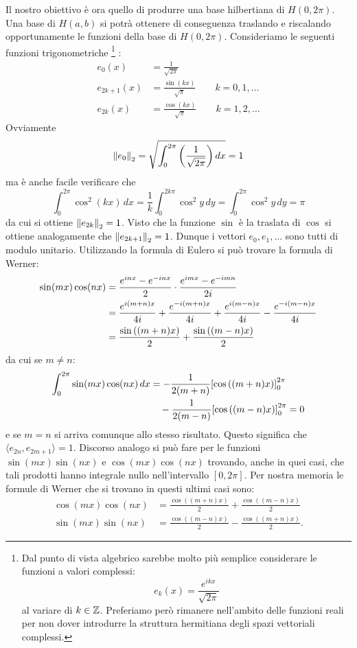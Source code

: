 Il nostro obiettivo è ora quello di produrre una base hilbertiana di $H(0,2\pi)$.
Una base di $H(a,b)$ si potrà ottenere di conseguenza traslando e riscalando opportunamente le funzioni della base di $H(0,2\pi)$.
Consideriamo le seguenti funzioni trigonometriche%
\footnote{
Dal punto di vista algebrico sarebbe molto più semplice considerare le
funzioni a valori complessi:
\[
  e_k(x) = \frac{e^{ikx}}{\sqrt{2\pi}}
\]
al variare di $k\in \mathbb Z$. Preferiamo però rimanere nell'ambito delle funzioni
reali per non dover introdurre la struttura hermitiana
degli spazi vettoriali complessi.}%
:
\begin{equation}\label{eq:54741346}
\begin{aligned}
  e_0 (x) &= \frac{1}{\sqrt{2\pi}} \\
  e_{2k+1}(x) &= \frac{\sin(kx)}{\sqrt{\pi}} \qquad k=0,1,\dots\\
  e_{2k}(x) &= \frac{\cos(kx)}{\sqrt{\pi}} \qquad k=1,2,\dots
\end{aligned}
\end{equation}
Ovviamente
\[
  {\left\Vert e_0\right\Vert}_2=\sqrt{\int_{0}^{2\pi} {\left( \frac{1}{\sqrt{2\pi}} \right)}\, dx} = 1
\]
ma è anche facile verificare che
\[
  \int_{0}^{2\pi} \cos^2 (kx)\, dx
  = \frac{1}{k}\int_{0}^{2k\pi} \cos^2 y\, dy
  = \int_{0}^{2\pi} \cos^2 y\, dy = \pi
\]
da cui si ottiene ${\left\Vert e_{2k}\right\Vert}_2 = 1$.
Visto che la funzione $\sin$ è la traslata di $\cos$ si
ottiene analogamente che ${\left\Vert e_{2k+1}\right\Vert}_2=1$.
Dunque i vettori $e_0,e_1,\dots$ sono tutti di modulo unitario.
Utilizzando la formula di Eulero
si può trovare la formula di Werner:
%
%
\begin{align*}
 \sin(mx)\cos(nx)
 &= \frac{e^{inx}-e^{-inx}}{2}\cdot \frac{e^{imx}-e^{-imn}}{2i}\\
 &= \frac{e^{i(m+n)x}}{4i} + \frac{e^{-i(m+n)x}}{4i} + \frac{e^{i(m-n)x}}{4i} - \frac{e^{-i(m-n)x}}{4i}\\
 &= \frac{\sin{\left( (m+n)x \right)}}{2} + \frac{\sin{\left( (m-n)x \right)}}{2}
\end{align*}
da cui se $m\neq n$:
\begin{align*}
 \int_{0}^{2\pi} \sin(mx)\cos(nx)\, dx &=
 -\frac 1 {2(m+n)} {\left[ \cos{\left( (m+n)x \right)} \right]}_{0}^{2\pi} \\
  &\quad - \frac{1}{2(m-n)}{\left[ \cos{\left( (m-n)x \right)} \right]}_{0}^{2\pi} = 0
\end{align*}
e se $m=n$ si arriva comunque allo stesso risultato.
Questo significa che $\langle e_{2n},e_{2m+1}\rangle = 1$.
Discorso analogo si può fare per le funzioni $\sin(mx)\sin(nx)$ e $\cos(mx)\cos(nx)$
trovando, anche in quei casi, che tali prodotti hanno integrale nullo
nell'intervallo $[0,2\pi]$.
Per nostra memoria le formule di Werner che si trovano
in questi ultimi casi sono:
%
%
\begin{align*}
  \cos(mx) \cos(nx) &=  \frac{\cos((m+n)x)}{2} + \frac{\cos((m-n)x)}{2}\\
  \sin(mx) \sin(nx) &=  \frac{\cos((m-n)x)}{2} - \frac{\cos((m+n)x)}{2}.
\end{align*}

